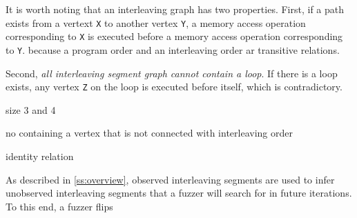 It is worth noting that an interleaving graph has two
properties. First, if a path exists from a vertext \texttt{X} to
another vertex \texttt{Y}, a memory access operation corresponding to
\texttt{X} is executed before a memory access operation corresponding
to \texttt{Y}.
%
because a program order and an interleaving order ar
transitive relations.
%

Second, \textit{all interleaving segment graph cannot contain a loop}.
%
If there is a loop exists, any vertex \texttt{Z} on the loop is
executed before itself, which is contradictory.


%



%
size 3 and 4

no containing a vertex that is not connected with interleaving order

identity relation


%
As described in \autoref{ss:overview}, observed interleaving segments
are used to infer unobserved interleaving segments that a fuzzer will
search for in future iterations.
%
To this end, a fuzzer flips 

